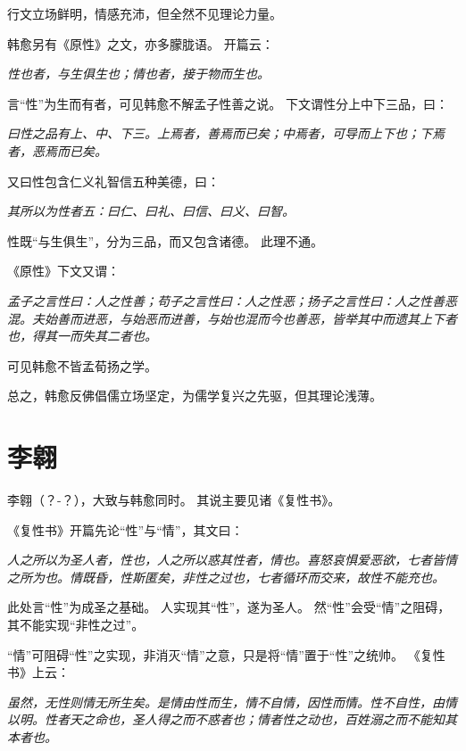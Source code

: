 \documentclass[11pt]{article}
\begin{document}
行文立场鲜明，情感充沛，但全然不见理论力量。

\newline

韩愈另有《原性》之文，亦多朦胧语。
开篇云：

\textit{性也者，与生俱生也；情也者，接于物而生也。}

言“性”为生而有者，可见韩愈不解孟子性善之说。
下文谓性分上中下三品，曰：

\textit{曰性之品有上、中、下三。上焉者，善焉而已矣；中焉者，可导而上下也；下焉者，恶焉而已矣。}

又曰性包含仁义礼智信五种美德，曰：

\textit{其所以为性者五：曰仁、曰礼、曰信、曰义、曰智。}

性既“与生俱生”，分为三品，而又包含诸德。
此理不通。

\newline

《原性》下文又谓：

\textit{孟子之言性曰：人之性善；苟子之言性曰：人之性恶；扬子之言性曰：人之性善恶混。夫始善而进恶，与始恶而进善，与始也混而今也善恶，皆举其中而遗其上下者也，得其一而失其二者也。}

可见韩愈不皆孟荀扬之学。

\newline

总之，韩愈反佛倡儒立场坚定，为儒学复兴之先驱，但其理论浅薄。

\section{李翱}
李翱（？-？），大致与韩愈同时。
其说主要见诸《复性书》。

\newline

《复性书》开篇先论“性”与“情”，其文曰：

\textit{人之所以为圣人者，性也，人之所以惑其性者，情也。喜怒哀惧爱恶欲，七者皆情之所为也。情既昏，性斯匿矣，非性之过也，七者循环而交来，故性不能充也。}

此处言“性”为成圣之基础。
人实现其“性”，遂为圣人。
然“性”会受“情”之阻碍，其不能实现“非性之过”。

\newline

“情”可阻碍“性”之实现，非消灭“情”之意，只是将“情”置于“性”之统帅。
《复性书》上云：

\textit{虽然，无性则情无所生矣。是情由性而生，情不自情，因性而情。性不自性，由情以明。性者天之命也，圣人得之而不惑者也；情者性之动也，百姓溺之而不能知其本者也。}
\end{document}
